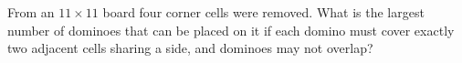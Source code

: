 From an $11\times11$ board four corner cells were removed. What is the largest number of dominoes that can be placed on it if each domino must cover exactly two adjacent cells sharing a side, and dominoes may not overlap?
